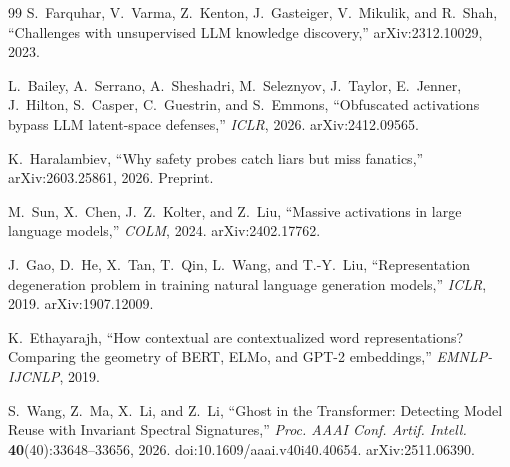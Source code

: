 \documentclass[11pt]{article}
\theoremstyle{definition}
\theoremstyle{remark}
\begin{document}
\begin{thebibliography}{99}
S.~Farquhar, V.~Varma, Z.~Kenton, J.~Gasteiger, V.~Mikulik, and R.~Shah,
``Challenges with unsupervised LLM knowledge discovery,''
arXiv:2312.10029, 2023.

L.~Bailey, A.~Serrano, A.~Sheshadri, M.~Seleznyov, J.~Taylor,
E.~Jenner, J.~Hilton, S.~Casper, C.~Guestrin, and S.~Emmons,
``Obfuscated activations bypass LLM latent-space defenses,''
\emph{ICLR}, 2026. arXiv:2412.09565.

K.~Haralambiev,
``Why safety probes catch liars but miss fanatics,''
arXiv:2603.25861, 2026. Preprint.

M.~Sun, X.~Chen, J.~Z.~Kolter, and Z.~Liu,
``Massive activations in large language models,''
\emph{COLM}, 2024. arXiv:2402.17762.

J.~Gao, D.~He, X.~Tan, T.~Qin, L.~Wang, and T.-Y.~Liu,
``Representation degeneration problem in training natural language generation models,''
\emph{ICLR}, 2019. arXiv:1907.12009.

K.~Ethayarajh,
``How contextual are contextualized word representations? Comparing the geometry of BERT,
ELMo, and GPT-2 embeddings,''
\emph{EMNLP-IJCNLP}, 2019.

S.~Wang, Z.~Ma, X.~Li, and Z.~Li,
``Ghost in the Transformer: Detecting Model Reuse with Invariant Spectral Signatures,''
\emph{Proc. AAAI Conf. Artif. Intell.} \textbf{40}(40):33648--33656, 2026.
doi:10.1609/aaai.v40i40.40654. arXiv:2511.06390.

\end{thebibliography}
\end{document}
